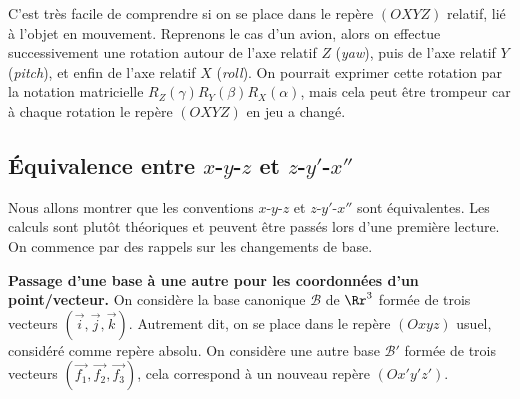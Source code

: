 \documentclass[11pt,class=report,crop=false]{standalone}
\begin{document}
\begin{center}
	\begin{minipage}{0.45\textwidth}
	\end{minipage}
		\qquad
	\begin{minipage}{0.45\textwidth}	
	\end{minipage}	
\end{center}
	
\begin{center}
	\begin{minipage}{0.45\textwidth}
	\end{minipage}
	\qquad
	\begin{minipage}{0.45\textwidth}	
	\end{minipage}	
\end{center}

C'est très facile de comprendre si on se place dans le repère  $(OXYZ)$ relatif, lié à l'objet en mouvement. Reprenons le cas d'un avion, alors on effectue successivement une rotation autour de l'axe relatif $Z$ (\emph{yaw}), puis de l'axe relatif $Y$ (\emph{pitch}), et enfin de l'axe relatif $X$ (\emph{roll}).
On pourrait exprimer cette rotation par la notation matricielle $R_Z(\gamma) R_Y(\beta) R_X(\alpha)$, mais cela peut être trompeur car à chaque rotation le repère $(OXYZ)$ en jeu a changé.


\subsection{Équivalence entre $x$-$y$-$z$ et $z$-$y'$-$x''$}

Nous allons montrer que les conventions $x$-$y$-$z$ et $z$-$y'$-$x''$ sont équivalentes.
Les calculs sont plutôt théoriques et peuvent être passés lors d'une première lecture.
On commence par des rappels sur les changements de base.


\textbf{Passage d'une base à une autre pour les coordonnées d'un point/vecteur.}
On considère la base canonique $\mathcal{B}$ de $\Rr^3$ formée de trois vecteurs $(\vec i, \vec j, \vec k)$. Autrement dit, on se place dans le repère $(Oxyz)$ usuel, considéré comme repère absolu.
On considère une autre base $\mathcal{B}'$ formée de trois vecteurs $(\vec{f_1},\vec{f_2},\vec{f_3})$, cela correspond à un nouveau repère $(Ox'y'z')$.
\end{document}
